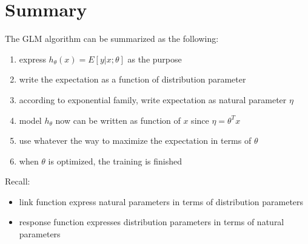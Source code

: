 \documentclass[10pt,a4paper,oneside]{article}
\begin{document}
\section{Summary}
The GLM algorithm can be summarized as the following:
\begin{enumerate}
	\item express $h_\theta(x) = E[y|x; \theta]$ as the purpose
	\item write the expectation as a function of distribution parameter
	\item according to exponential family, write expectation as natural parameter $\eta$
	\item model $h_\theta$ now can be written as function of $x$ since $\eta = \theta^T x$
	\item use whatever the way to maximize the expectation in terms of $\theta$
	\item when $\theta$ is optimized, the training is finished
\end{enumerate}
Recall:
\begin{itemize}
	\item link function express natural parameters in terms of distribution parameters
	\item response function expresses distribution parameters in terms of natural parameters
\end{itemize}
\end{document}
